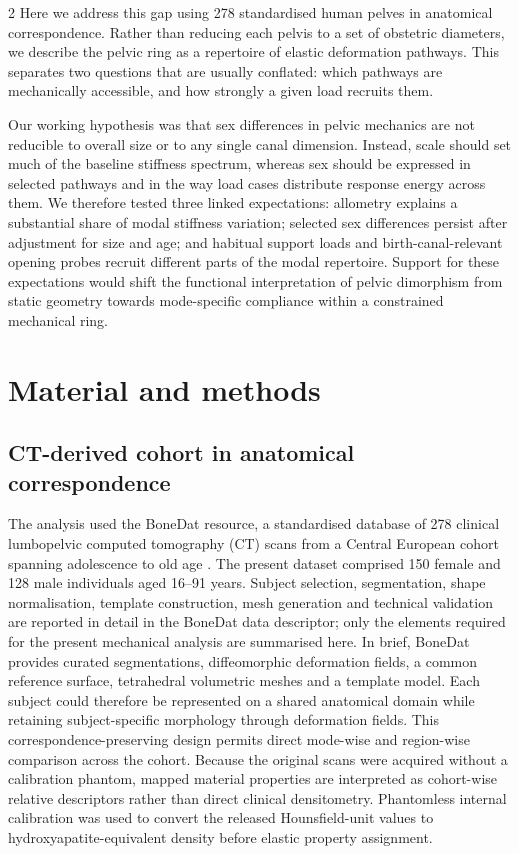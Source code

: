\documentclass[openacc]{rsproca_new}
\begin{document}
\begin{multicols}{2}
Here we address this gap using 278 standardised human pelves in anatomical correspondence. Rather than reducing each pelvis to a set of obstetric diameters, we describe the pelvic ring as a repertoire of elastic deformation pathways. This separates two questions that are usually conflated: which pathways are mechanically accessible, and how strongly a given load recruits them.

Our working hypothesis was that sex differences in pelvic mechanics are not reducible to overall size or to any single canal dimension. Instead, scale should set much of the baseline stiffness spectrum, whereas sex should be expressed in selected pathways and in the way load cases distribute response energy across them. We therefore tested three linked expectations: allometry explains a substantial share of modal stiffness variation; selected sex differences persist after adjustment for size and age; and habitual support loads and birth-canal-relevant opening probes recruit different parts of the modal repertoire. Support for these expectations would shift the functional interpretation of pelvic dimorphism from static geometry towards mode-specific compliance within a constrained mechanical ring.

\section{Material and methods}

\subsection{CT-derived cohort in anatomical correspondence}

The analysis used the BoneDat resource, a standardised database of 278 clinical lumbopelvic computed tomography (CT) scans from a Central European cohort spanning adolescence to old age \cite{HenysKuchar2025}. The present dataset comprised 150 female and 128 male individuals aged 16--91 years. Subject selection, segmentation, shape normalisation, template construction, mesh generation and technical validation are reported in detail in the BoneDat data descriptor; only the elements required for the present mechanical analysis are summarised here. In brief, BoneDat provides curated segmentations, diffeomorphic deformation fields, a common reference surface, tetrahedral volumetric meshes and a template model. Each subject could therefore be represented on a shared anatomical domain while retaining subject-specific morphology through deformation fields. This correspondence-preserving design permits direct mode-wise and region-wise comparison across the cohort. Because the original scans were acquired without a calibration phantom, mapped material properties are interpreted as cohort-wise relative descriptors rather than direct clinical densitometry. Phantomless internal calibration was used to convert the released Hounsfield-unit values to hydroxyapatite-equivalent density before elastic property assignment.


\end{multicols}
\end{document}

